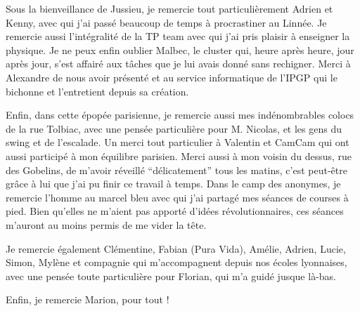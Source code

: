 Sous la  bienveillance de  Jussieu, je remercie  tout particulièrement
Adrien et Kenny, avec qui j’ai  passé beaucoup de temps à procrastiner
au Linnée.   Je remercie aussi  l'intégralité de  la TP team  avec qui
j'ai pris plaisir  à enseigner la physique.  Je ne  peux enfin oublier
Malbec,  le cluster  qui, heure  après heure,  jour après  jour, s’est
affairé aux  tâches que je  lui avais  donné sans rechigner.   Merci à
Alexandre de nous avoir présenté  et au service informatique de l’IPGP
qui le bichonne et l’entretient depuis sa création.

Enfin,   dans  cette   épopée  parisienne,   je  remercie   aussi  mes
indénombrables colocs de la rue  Tolbiac, avec une pensée particulière
pour M.   Nicolas, et les  gens du swing  et de l’escalade.   Un merci
tout particulier  à Valentin et CamCam  qui ont aussi participé  à mon
équilibre  parisien. Merci  aussi  à  mon voisin  du  dessus, rue  des
Gobelins, de m’avoir réveillé  ``délicatement'' tous les matins, c’est
peut-être grâce à  lui que j’ai pu  finir ce travail à  temps. Dans le
camp des  anonymes, je remercie l’homme  au marcel bleu avec  qui j’ai
partagé mes  séances de courses à  pied. Bien qu’elles ne  m’aient pas
apporté d’idées révolutionnaires, ces séances m’auront au moins permis
de me vider la tête.

Je remercie également Clémentine,  Fabian (Pura Vida), Amélie, Adrien,
Lucie, Simon, Mylène et compagnie qui m’accompagnent depuis nos écoles
lyonnaises, avec une  pensée toute particulière pour  Florian, qui m’a
guidé jusque là-bas.

Enfin, je remercie Marion, pour tout !











\vspace{2cm}

